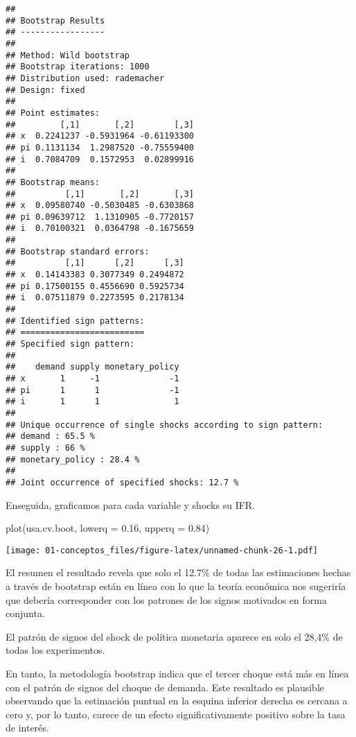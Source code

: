 \documentclass[
]{book}
\newenvironment{Shaded}{\begin{snugshade}}{\end{snugshade}}
\newcommand{\AttributeTok}[1]{\textcolor[rgb]{0.77,0.63,0.00}{#1}}
\newcommand{\FloatTok}[1]{\textcolor[rgb]{0.00,0.00,0.81}{#1}}
\newcommand{\FunctionTok}[1]{\textcolor[rgb]{0.00,0.00,0.00}{#1}}
\newcommand{\NormalTok}[1]{#1}
\begin{document}
\begin{verbatim}
## 
## Bootstrap Results
## ----------------- 
## 
## Method: Wild bootstrap
## Bootstrap iterations: 1000
## Distribution used: rademacher
## Design: fixed
## 
## Point estimates: 
##         [,1]       [,2]        [,3]
## x  0.2241237 -0.5931964 -0.61193300
## pi 0.1131134  1.2987520 -0.75559400
## i  0.7084709  0.1572953  0.02899916
## 
## Bootstrap means: 
##          [,1]       [,2]       [,3]
## x  0.09580740 -0.5030485 -0.6303868
## pi 0.09639712  1.1310905 -0.7720157
## i  0.70100321  0.0364798 -0.1675659
## 
## Bootstrap standard errors: 
##          [,1]      [,2]      [,3]
## x  0.14143383 0.3077349 0.2494872
## pi 0.17500155 0.4556690 0.5925734
## i  0.07511879 0.2273595 0.2178134
## 
## Identified sign patterns: 
## =========================
## Specified sign pattern: 
## 
##    demand supply monetary_policy
## x       1     -1              -1
## pi      1      1              -1
## i       1      1               1
## 
## Unique occurrence of single shocks according to sign pattern: 
## demand : 65.5 % 
## supply : 66 % 
## monetary_policy : 28.4 % 
## 
## Joint occurrence of specified shocks: 12.7 %
\end{verbatim}

Enseguida, graficamos para cada variable y shocks su IFR.

\begin{Shaded}
\begin{Highlighting}[]
\FunctionTok{plot}\NormalTok{(usa.cv.boot, }\AttributeTok{lowerq =} \FloatTok{0.16}\NormalTok{, }\AttributeTok{upperq =} \FloatTok{0.84}\NormalTok{)}
\end{Highlighting}
\end{Shaded}

\texttt{[image: 01-conceptos\_files/figure-latex/unnamed-chunk-26-1.pdf]}

El resumen el resultado revela que solo el 12.7\% de todas las estimaciones hechas a través de bootstrap están en línea con lo que la teoría económica nos sugeriría que debería corresponder con los patrones de los signos motivados en forma conjunta.

El patrón de signos del shock de política monetaria aparece en solo el 28,4\% de todas los experimentos.

En tanto, la metodología bootstrap indica que el tercer choque está más en línea con el patrón de signos del choque de demanda. Este resultado es plausible observando que la estimación puntual en la esquina inferior derecha es cercana a cero y, por lo tanto, carece de un efecto significativamente positivo sobre la tasa de interés.
\end{document}
